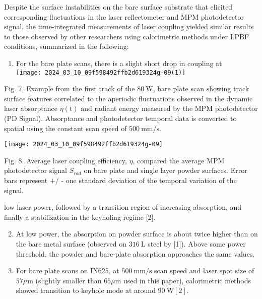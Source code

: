\documentclass[10pt]{article}
\begin{document}
Despite the surface instabilities on the bare surface substrate that elicited corresponding fluctuations in the laser reflectometer and MPM photodetector signal, the time-integrated measurements of laser coupling yielded similar results to those observed by other researchers using calorimetric methods under LPBF conditions, summarized in the following:

\begin{enumerate}
  \item For the bare plate scans, there is a slight short drop in coupling at\\
\texttt{[image: 2024\_03\_10\_09f598492ffb2d619324g-09(1)]}
\end{enumerate}

Fig. 7. Example from the first track of the $80 \mathrm{~W}$, bare plate scan showing track surface features correlated to the aperiodic fluctuations observed in the dynamic laser absorptance $\eta(\mathrm{t})$ and radiant energy measured by the MPM photodetector (PD Signal). Absorptance and photodetector temporal data is converted to spatial using the constant scan speed of $500 \mathrm{~mm} / \mathrm{s}$.

\begin{center}
\texttt{[image: 2024\_03\_10\_09f598492ffb2d619324g-09]}
\end{center}

Fig. 8. Average laser coupling efficiency, $\eta$, compared the average MPM photodetector signal $S_{r a d}$ on bare plate and single layer powder surfaces. Error bars represent $+/$ - one standard deviation of the temporal variation of the signal.

low laser power, followed by a transition region of increasing absorption, and finally a stabilization in the keyholing regime [2].

\begin{enumerate}
  \setcounter{enumi}{1}
  \item At low power, the absorption on powder surface is about twice higher than on the bare metal surface (observed on $316 \mathrm{~L}$ steel by [1]). Above some power threshold, the powder and bare-plate absorption approaches the same values.

  \item For bare plate scans on IN625, at $500 \mathrm{~mm} / \mathrm{s}$ scan speed and laser spot size of $57 \mu \mathrm{m}$ (slightly smaller than $65 \mu \mathrm{m}$ used in this paper), calorimetric methods showed transition to keyhole mode at around $90 \mathrm{~W}[2]$.

\end{enumerate}
\end{document}
